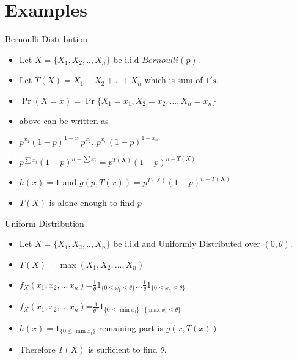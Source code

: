 \documentclass[aspectratio=169,xcolor=dvipsnames]{beamer}
\begin{document}
\section{Examples}
\begin{frame}{Bernoulli Distribution}
  \begin{itemize}
      \item Let $X=\{X_1,X_2,..,X_n\}$ be i.i.d $Bernoulli(p)$.
      \item Let $T(X)=X_1+X_2+..+X_n$ which is sum of $1's$.
      \item $\Pr{(X=x)}=\Pr{\{X_1=x_1,X_2=x_2,...,X_n=x_n\}}$
      \item above can be written as
      \item $p^{x_1}(1-p)^{1-x_1}p^{x_2}..p^{x_n}(1-p)^{1-x_n}$
      \item $p^{\sum x_i}(1-p)^{n-\sum x_i}=p^{T(X)}(1-p)^{n-T(X)}$
      \item $h(x)=1$ and $g(p,T(x))=p^{T(X)}(1-p)^{n-T(X)}$
      
      \item $T(X)$ is alone enough to find $p$
  \end{itemize} 
  
\end{frame}


\begin{frame}{Uniform Distribution}
  \begin{itemize}
      \item Let $X=\{X_1,X_2,..,X_n\}$ be i.i.d and Uniformly Distributed over $(0,\theta)$.
      \item $T(X)=\max (X_1,X_2,...,X_n)$
      \item $f_X(x_1,x_2,..,x_n)$=$\frac{1}{\theta}1_{\{0\leq x_1 \leq\theta\}}...\frac{1}{\theta}1_{\{0\leq x_n \leq\theta\}}$
      \item $f_X(x_1,x_2,..,x_n)$=$\frac{1}{\theta^n}1_{\{0\leq \min{x_i}\}}1_{\{\max{x_i}\leq\theta\}}$
      \item $h(x)=1_{\{0\leq \min{x_i}\}}$ remaining part is $g(x,T(x))$
      \item Therefore $T(X)$ is sufficient to find $\theta$.
  \end{itemize}
\end{frame}

\end{document}
